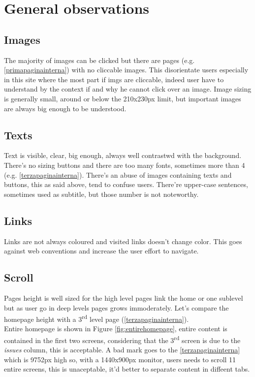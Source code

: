 \documentclass[
10pt, %
a4paper, %
oneside, %
headinclude,footinclude, %
BCOR5mm, %
]{scrartcl}
\begin{document}

\newpage
\section{General observations}

	\subsection{Images}
	The majority of images can be clicked but there are pages (e.g. \ref{primapaginainterna}) with no cliccable images. This disorientate users especially in this site where the most part if imgs are cliccable, indeed user have to understand by the context if and why he cannot click over an image.
	Image sizing is generally small, around or below the 210x230px limit, but important images are always big enough to be understood.

	\subsection{Texts}
	Text is visible, clear, big enough, always well contrastwd with the background. There's no sizing buttons and there are too many fonts, sometimes more than 4 (e.g. \ref{terzapaginainterna}).
	There's an abuse of images containing texts and buttons, this as said above, tend to confuse users. 
	There're upper-case sentences, sometimes used as subtitle, but those number is not noteworthy.

	\subsection{Links}
	Links are not always coloured and visited links doesn't change color. This goes against web conventions and increase the user effort to navigate. 

	\subsection{Scroll}
	Pages height is well sized for the high level pages link the home or one sublevel but as user go in deep levels pages grows immoderately. Let's compare the homepage height with a 3\textsuperscript{rd} level page (\ref{terzapaginainterna}). \\
	Entire homepage is shown in Figure \ref{fig:entirehomepage}, entire content is contained in the first two screens, considering that the 3\textsuperscript{rd} screen is due to the \emph{issues} column, this is acceptable.
	A bad mark goes to the \ref{terzapaginainterna} which is 9752px high so, with a 1440x900px monitor, users needs to scroll 11 entire screens, this is unaceptable, it'd better to separate content in diffeent tabs. 
\end{document}
